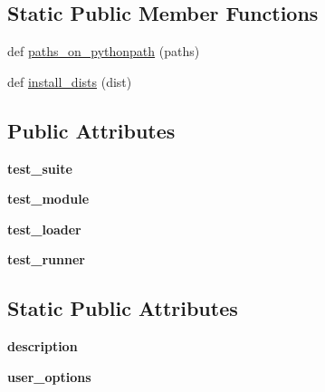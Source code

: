 \subsection*{Static Public Member Functions}
\begin{DoxyCompactItemize}
\item 
def \hyperlink{classsetuptools_1_1command_1_1test_1_1test_a222ab40c892904a39bf415edf4b62ab4}{paths\+\_\+on\+\_\+pythonpath} (paths)
\item 
def \hyperlink{classsetuptools_1_1command_1_1test_1_1test_af0362ad01b35d885c41cb12f395c6987}{install\+\_\+dists} (dist)
\end{DoxyCompactItemize}
\subsection*{Public Attributes}
\begin{DoxyCompactItemize}
\item 
\mbox{\label{classsetuptools_1_1command_1_1test_1_1test_aab9ab12c8acec96fbf5287cf81028c16}} 
{\bfseries test\+\_\+suite}
\item 
\mbox{\label{classsetuptools_1_1command_1_1test_1_1test_ad820e39bc19665bd65fac656db657e60}} 
{\bfseries test\+\_\+module}
\item 
\mbox{\label{classsetuptools_1_1command_1_1test_1_1test_ae12f9aa573e8fc369020284ea5cfb4b8}} 
{\bfseries test\+\_\+loader}
\item 
\mbox{\label{classsetuptools_1_1command_1_1test_1_1test_aca41d56e48dcabf2067540cafc3276d5}} 
{\bfseries test\+\_\+runner}
\end{DoxyCompactItemize}
\subsection*{Static Public Attributes}
\begin{DoxyCompactItemize}
\item 
\mbox{\label{classsetuptools_1_1command_1_1test_1_1test_a60ea1fc63bca31dc147dd1d2fc5183ba}} 
{\bfseries description}
\item 
\mbox{\label{classsetuptools_1_1command_1_1test_1_1test_ab0387d4eed8df56f938f0c399aaf2a9a}} 
{\bfseries user\+\_\+options}
\end{DoxyCompactItemize}


